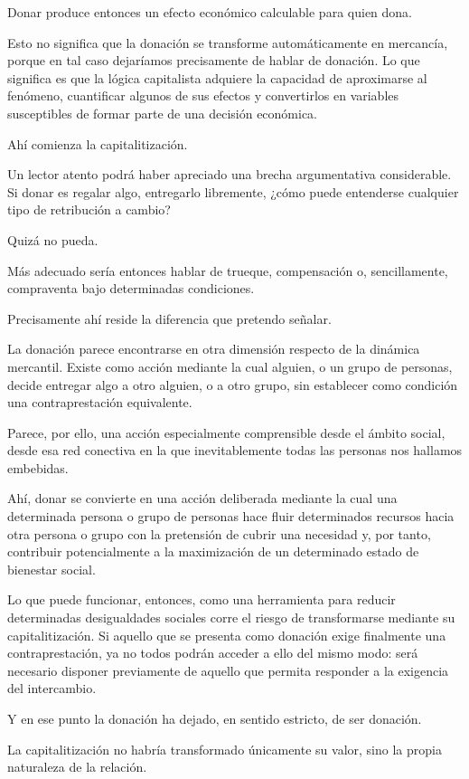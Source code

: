\documentclass[12pt]{article}
\begin{document}
Donar produce entonces un efecto económico calculable para quien dona.

Esto no significa que la donación se transforme automáticamente en mercancía, porque en tal caso dejaríamos precisamente de hablar de donación. Lo que significa es que la lógica capitalista adquiere la capacidad de aproximarse al fenómeno, cuantificar algunos de sus efectos y convertirlos en variables susceptibles de formar parte de una decisión económica.

Ahí comienza la capitalitización.

Un lector atento podrá haber apreciado una brecha argumentativa considerable. Si donar es regalar algo, entregarlo libremente, ¿cómo puede entenderse cualquier tipo de retribución a cambio?

Quizá no pueda.

Más adecuado sería entonces hablar de trueque, compensación o, sencillamente, compraventa bajo determinadas condiciones.

Precisamente ahí reside la diferencia que pretendo señalar.

La donación parece encontrarse en otra dimensión respecto de la dinámica mercantil. Existe como acción mediante la cual alguien, o un grupo de personas, decide entregar algo a otro alguien, o a otro grupo, sin establecer como condición una contraprestación equivalente.

Parece, por ello, una acción especialmente comprensible desde el ámbito social, desde esa red conectiva en la que inevitablemente todas las personas nos hallamos embebidas.

Ahí, donar se convierte en una acción deliberada mediante la cual una determinada persona o grupo de personas hace fluir determinados recursos hacia otra persona o grupo con la pretensión de cubrir una necesidad y, por tanto, contribuir potencialmente a la maximización de un determinado estado de bienestar social.

Lo que puede funcionar, entonces, como una herramienta para reducir determinadas desigualdades sociales corre el riesgo de transformarse mediante su capitalitización. Si aquello que se presenta como donación exige finalmente una contraprestación, ya no todos podrán acceder a ello del mismo modo: será necesario disponer previamente de aquello que permita responder a la exigencia del intercambio.

Y en ese punto la donación ha dejado, en sentido estricto, de ser donación.

La capitalitización no habría transformado únicamente su valor, sino la propia naturaleza de la relación.
\end{document}
